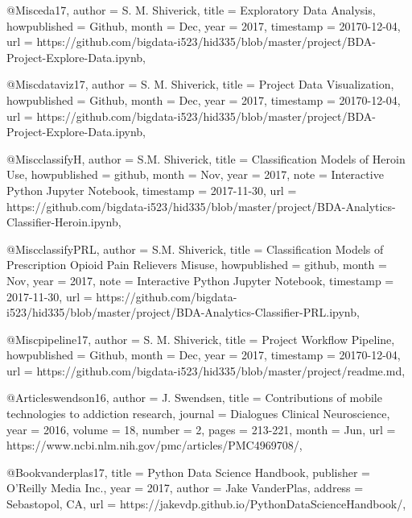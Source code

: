 {@Misc{eda17,
  author       = {S. M. Shiverick},
  title        = {Exploratory Data Analysis},
  howpublished = {Github},
  month        = Dec,
  year         = {2017},
  timestamp    = {20170-12-04},
  url          = {https://github.com/bigdata-i523/hid335/blob/master/project/BDA-Project-Explore-Data.ipynb},
}

@Misc{dataviz17,
  author       = {S. M. Shiverick},
  title        = {Project Data Visualization},
  howpublished = {Github},
  month        = Dec,
  year         = {2017},
  timestamp    = {20170-12-04},
  url          = {https://github.com/bigdata-i523/hid335/blob/master/project/BDA-Project-Explore-Data.ipynb},
}

@Misc{classifyH,
  author       = {S.M. Shiverick},
  title        = {Classification Models of Heroin Use},
  howpublished = {github},
  month        = Nov,
  year         = {2017},
  note         = {Interactive Python Jupyter Notebook},
  timestamp    = {2017-11-30},
  url          = {https://github.com/bigdata-i523/hid335/blob/master/project/BDA-Analytics-Classifier-Heroin.ipynb},
}

@Misc{classifyPRL,
  author       = {S.M. Shiverick},
  title        = {Classification Models of Prescription Opioid Pain Relievers Misuse},
  howpublished = {github},
  month        = Nov,
  year         = {2017},
  note         = {Interactive Python Jupyter Notebook},
  timestamp    = {2017-11-30},
  url          = {https://github.com/bigdata-i523/hid335/blob/master/project/BDA-Analytics-Classifier-PRL.ipynb},
}

@Misc{pipeline17,
  author       = {S. M. Shiverick},
  title        = {Project Workflow Pipeline},
  howpublished = {Github},
  month        = Dec,
  year         = {2017},
  timestamp    = {20170-12-04},
  url          = {https://github.com/bigdata-i523/hid335/blob/master/project/readme.md},
}


@Article{swendson16,
  author  = {J. Swendsen},
  title   = {Contributions of mobile technologies to addiction research},
  journal = {Dialogues Clinical Neuroscience},
  year    = {2016},
  volume  = {18},
  number  = {2},
  pages   = {213-221},
  month   = Jun,
  url     = {https://www.ncbi.nlm.nih.gov/pmc/articles/PMC4969708/},
}

@Book{vanderplas17,
  title     = {Python Data Science Handbook},
  publisher = {O'Reilly Media Inc.},
  year      = {2017},
  author    = {Jake VanderPlas},
  address   = {Sebastopol, CA},
  url       = {https://jakevdp.github.io/PythonDataScienceHandbook/},
}


}
